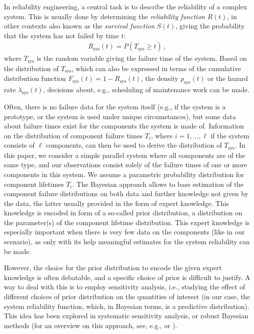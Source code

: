 \documentclass[12pt,a4paper,twocolumn,fleqn]{narms}
\begin{document}
In reliability engineering, a central task is to describe the reliability of a complex system.
This is usually done by determining the \emph{reliability function} $R(t)$,
in other contexts also known as the \emph{survival function} $S(t)$,
giving the probability that the system has not failed by time $t$:
\begin{align}
R_\text{sys}(t) = P(T_\text{sys} \geq t)\,,
\end{align}
where $T_\text{sys}$ is the random variable giving the failure time of the system. %
Based on the distribution of $T_\text{sys}$, which can also be expressed
in terms of the cumulative distribution function $F_\text{sys}(t) = 1 - R_\text{sys}(t)$,
the density $p_\text{sys}(t)$ or the hazard rate $\lambda_\text{sys}(t)$,
decisions about, e.g., scheduling of maintenance work can be made.

Often, there is no failure data for the system itself
(e.g., if the system is a prototype, or the system is used under unique circumstances),
but some data about failure times exist for the components the system is made of.
Information on the distribution of component failure times $T_i$,
where $i = 1, \ldots, \ell$ if the system consists of $\ell$ components,
can then be used to derive the distribution of $T_\text{sys}$.
In this paper, we consider a simple parallel system
where all components are of the same type,
and our observations consist solely of the failure times of one or more components in this system.
%
We assume a parametric probability distribution for component lifetimes $T_i$. 
The Bayesian approach allows to base estimation of the component failure distributions
on both data and further knowledge not given by the data,
the latter usually provided in the form of expert knowledge.
This knowledge is encoded in form of a so-called prior distribution,
a distribution on the parameter(s) of the component lifetime distribution.
This expert knowledge is especially important when there is very few data on the components (like in our scenario),
as only with its help meaningful estimates for the system reliability can be made.

However, the choice for the prior distribution to encode the given expert knowledge is often debatable,
and a specific choice of prior is difficult to justify.
A way to deal with this is to employ sensitivity analysis,
i.e., studying the effect of different choices of prior distribution on the quantities of interest
(in our case, the system reliability function, which, in Bayesian terms, is a predictive distribution).
This idea has been explored in systematic sensitivity analysis, or robust Bayesian methods
(for an overview on this approach, see, e.g.,
 or ). %
\end{document}
